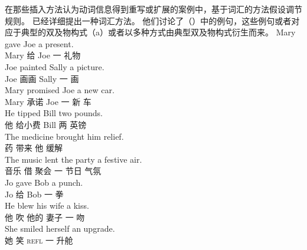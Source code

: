     在那些插入方法认为动词信息得到重写或扩展的案例中，基于词汇的方法假设调节规则。 \citet[\S~4]{BC99a}已经详细提出一种词汇方法。
他们讨论了（）中的例句，这些例句或者对应于典型的双及物构式（a）或者以多种方式由典型双及物构式衍生而来。
\eal
\ex 
\gll Mary gave Joe a present.\\
Mary 给 Joe 一 礼物\\
\ex\label{paint} 
\gll Joe painted Sally a picture.\\
Joe 画画 Sally 一 画\\
\ex 
\gll Mary promised Joe a new car.\\
Mary 承诺 Joe 一 新 车\\
\ex 
\gll He tipped Bill two pounds.\\
他 给小费 Bill 两 英镑\\
\ex 
\gll The medicine brought him relief.\\
 药 带来 他 缓解\\
\ex 
\gll The music lent the party a festive air.\\
 音乐 借  聚会 一 节日 气氛\\
\ex 
\gll Jo gave Bob a punch.\\
Jo 给 Bob 一 拳\\
\ex 
\gll He blew his wife a kiss.\\
他 吹 他的 妻子 一 吻\\
\ex\label{ex-smiled-herself-an-upgrade} 
\gll She smiled herself an upgrade.\\
她 笑  \textsc{refl} 一 升舱\\
